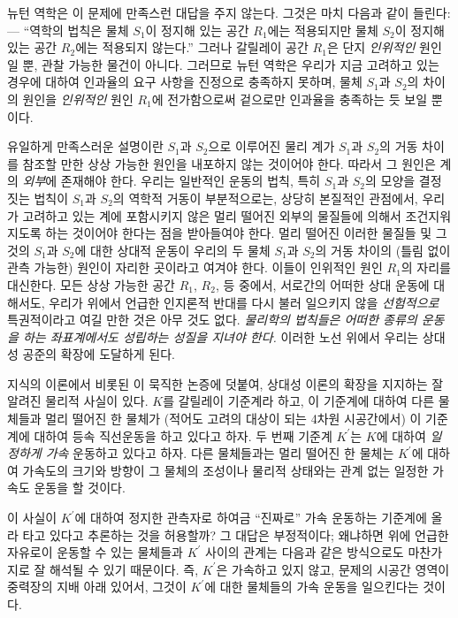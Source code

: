 \documentclass[b5paper]{article}
\begin{document}
뉴턴 역학은 이 문제에 만족스런 대답을 주지 않는다. 그것은 마치 다음과 같이 들린다: --- ``역학의 법칙은 물체 $S_1$이 정지해 있는 공간 $R_1$에는 적용되지만 물체 $S_2$이 정지해 있는 공간 $R_2$에는 적용되지 않는다.'' 그러나 갈릴레이 공간 $R_1$은 단지 \emph{인위적인} 원인일 뿐, 관찰 가능한 물건이 아니다. 그러므로 뉴턴 역학은 우리가 지금 고려하고 있는 경우에 대하여 인과율의 요구 사항을 진정으로 충족하지 못하며, 물체 $S_1$과 $S_2$의 차이의 원인을 \emph{인위적인} 원인 $R_1$에 전가함으로써 겉으로만 인과율을 충족하는 듯 보일 뿐이다.

유일하게 만족스러운 설명이란 $S_1$과 $S_2$으로 이루어진 물리 계가 $S_1$과 $S_2$의 거동 차이를 참조할 만한 상상 가능한 원인을 내포하지 않는 것이어야 한다. 따라서 그 원인은 계의 \emph{외부}에 존재해야 한다. 우리는 일반적인 운동의 법칙, 특히 $S_1$과 $S_2$의 모양을 결정짓는 법칙이 $S_1$과 $S_2$의 역학적 거동이 부분적으로는, 상당히 본질적인 관점에서, 우리가 고려하고 있는 계에 포함시키지 않은 멀리 떨어진 외부의 물질들에 의해서 조건지워지도록 하는 것이어야 한다는 점을 받아들여야 한다. 멀리 떨어진 이러한 물질들 및 그것의 $S_1$과 $S_2$에 대한 상대적 운동이 우리의 두 물체 $S_1$과 $S_2$의 거동 차이의 (틀림 없이 관측 가능한) 원인이 자리한 곳이라고 여겨야 한다. 이들이 인위적인 원인 $R_1$의 자리를 대신한다. 모든 상상 가능한 공간 $R_1$, $R_2$, 등 중에서, 서로간의 어떠한 상대 운동에 대해서도, 우리가 위에서 언급한 인지론적 반대를 다시 불러 일으키지 않을 \emph{선험적으로} 특권적이라고 여길 만한 것은 아무 것도 없다. \emph{물리학의 법칙들은 어떠한 종류의 운동을 하는 좌표계에서도 성립하는 성질을 지녀야 한다.} 이러한 노선 위에서 우리는 상대성 공준의 확장에 도달하게 된다.

지식의 이론에서 비롯된 이 묵직한 논증에 덧붙여, 상대성 이론의 확장을 지지하는 잘 알려진 물리적 사실이 있다. $K$를 갈릴레이 기준계라 하고, 이 기준계에 대하여 다른 물체들과 멀리 떨어진 한 물체가 (적어도 고려의 대상이 되는 4차원 시공간에서) 이 기준계에 대하여 등속 직선운동을 하고 있다고 하자. 두 번째 기준계 $K^{\prime}$는 $K$에 대하여 \emph{일정하게 가속} 운동하고 있다고 하자.
다른 물체들과는 멀리 떨어진 한 물체는 $K^{\prime}$에 대하여 가속도의 크기와 방향이 그 물체의 조성이나 물리적 상태와는 관계 없는 일정한 가속도 운동을 할 것이다.

이 사실이 $K^{\prime}$에 대하여 정지한 관측자로 하여금 ``진짜로'' 가속 운동하는 기준계에 올라 타고 있다고 추론하는 것을 허용할까? 그 대답은 부정적이다; 왜냐하면 위에 언급한 자유로이 운동할 수 있는 물체들과 $K^{\prime}$ 사이의 관계는 다음과 같은 방식으로도 마찬가지로 잘 해석될 수 있기 때문이다. 즉, $K^{\prime}$은 가속하고 있지 않고, 문제의 시공간 영역이 중력장의 지배 아래 있어서, 그것이 $K^{\prime}$에 대한 물체들의 가속 운동을 일으킨다는 것이다.
\end{document}
